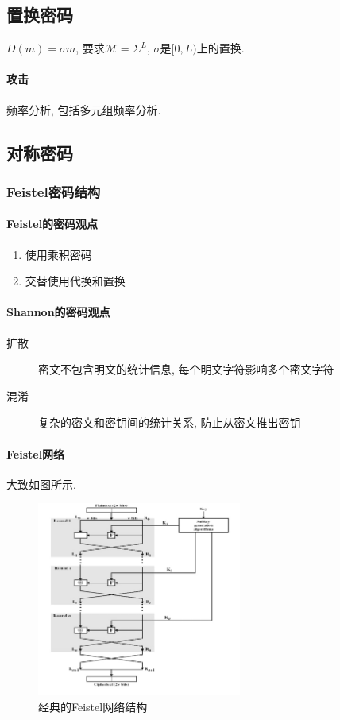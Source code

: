 \documentclass{ctexart}
\begin{document}
\subsection{置换密码}
    $D(m) = \sigma m$, 要求$\mathcal{M} = \Sigma^L$, $\sigma$是$[0, L)$上的置换.
\paragraph{攻击} 频率分析, 包括多元组频率分析.

\subsection{对称密码}
\subsubsection{Feistel密码结构}
\paragraph{Feistel的密码观点}
    \begin{enumerate}
        \item 使用乘积密码
        \item 交替使用代换和置换
    \end{enumerate}
\paragraph{Shannon的密码观点}
    \begin{description}
        \item[扩散] 密文不包含明文的统计信息, 每个明文字符影响多个密文字符
        \item[混淆] 复杂的密文和密钥间的统计关系, 防止从密文推出密钥
    \end{description}
\paragraph{Feistel网络}
    大致如图所示.
    \begin{figure}[ht!]
    \centering
    \includegraphics[width=0.6\textwidth]{feistel-net.png}
    \caption{经典的Feistel网络结构}
    \label{lenet-structure}
    \end{figure}
\end{document}
